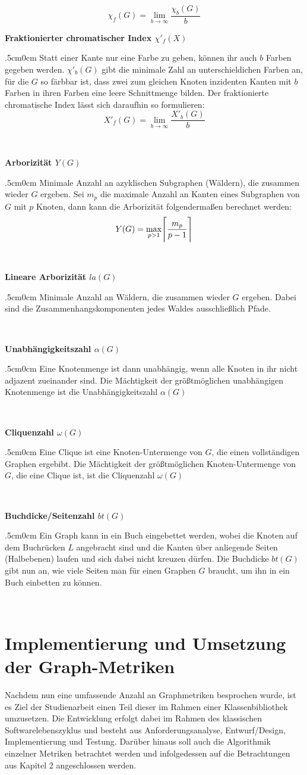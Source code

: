 \documentclass[a4paper,12pt,ngerman,chapterprefix=false,listof=totoc,bibliography=totoc]{scrreprt}
\makeatletter
\DeclarePairedDelimiter{\ceil}{\lceil}{\rceil}
\newcommand{\specialcell}[2][l]{%
  \begin{tabular}[#1]{@{}l@{}}#2\end{tabular}}
\newcommand{\metric}[2]{
	\textbf{#1}
	\begin{adjustwidth}{.5cm}{0cm}
		#2
	\end{adjustwidth}\hrulefill\\\vspace{2mm}
}
\makeatother
\begin{document}
{{{\[\chi_f(G)=\lim_{b\to\infty}\frac{\chi_b(G)}{b}\]
}
\metric{Fraktionierter chromatischer Index \(\chi'_f(X)\)}{Statt einer Kante nur eine Farbe zu geben, können ihr auch \(b\) Farben gegeben werden. \(\chi'_b(G)\) gibt die minimale Zahl an unterschieldichen Farben an, für die \(G\) so färbbar ist, dass zwei zum gleichen Knoten inzidenten Kanten mit \(b\) Farben in ihren Farben eine leere Schnittmenge bilden. Der fraktionierte chromatische Index lässt sich daraufhin so formulieren:
\[
	X'_f(G)=\lim_{b\to\infty}\frac{X'_b(G)}{b}
\]
}
\metric{Arborizität \(Y(G)\)}{Minimale Anzahl an azyklischen Subgraphen (Wäldern), die zusammen wieder \(G\) ergeben. Sei \(m_p\) die maximale Anzahl an Kanten eines Subgraphen von \(G\) mit \(p\) Knoten, dann kann die Arborizität folgendermaßen berechnet werden:
\[Y(G)=\max_{p>1}\ceil[\Bigg]{\frac{m_p}{p-1}}\]
}
\metric{Lineare Arborizität \(la(G)\)}{Minimale Anzahl an Wäldern, die zusammen wieder \(G\) ergeben. Dabei sind die Zusammenhangskomponenten jedes Waldes ausschließlich Pfade.}
\metric{Unabhängigkeitszahl \(\alpha(G)\)}{Eine Knotenmenge ist dann unabhängig, wenn alle Knoten in ihr nicht adjazent zueinander sind. Die Mächtigkeit der größtmöglichen unabhängigen Knotenmenge ist die Unabhängigkeitszahl \(\alpha(G)\)}
\metric{Cliquenzahl \(\omega(G)\)}{Eine Clique ist eine Knoten-Untermenge von \(G\), die einen vollständigen Graphen ergebibt. Die Mächtigkeit der größtmöglichen Knoten-Untermenge von \(G\), die eine Clique ist, ist die Cliquenzahl \(\omega(G)\)}
\metric{Buchdicke/Seitenzahl \(bt(G)\)}{Ein Graph kann in ein Buch eingebettet werden, wobei die Knoten auf dem Buchrücken \(L\) angebracht sind und die Kanten über anliegende Seiten (Halbebenen) laufen und sich dabei nicht kreuzen dürfen. Die Buchdicke \(bt(G)\) gibt nun an, wie viele Seiten man für einen Graphen \(G\) braucht, um ihn in ein Buch einbetten zu können.}
}
\chapter{Implementierung und Umsetzung der Graph-Metriken}
{
Nachdem nun eine umfassende Anzahl an Graphmetriken besprochen wurde, ist es Ziel der Studienarbeit einen Teil dieser im Rahmen einer Klassenbibliothek umzusetzen. Die Entwicklung erfolgt dabei im Rahmen des klassischen Softwarelebenszyklus und besteht aus Anforderungsanalyse, Entwurf/Design, Implementierung und Testung. \cite{balzert_lehrbuch_2009,balzert_lehrbuch_2011} Darüber hinaus soll auch die Algorithmik einzelner Metriken betrachtet werden und infolgedessen auf die Betrachtungen aus Kapitel 2 angeschlossen werden.
}
}
\end{document}
